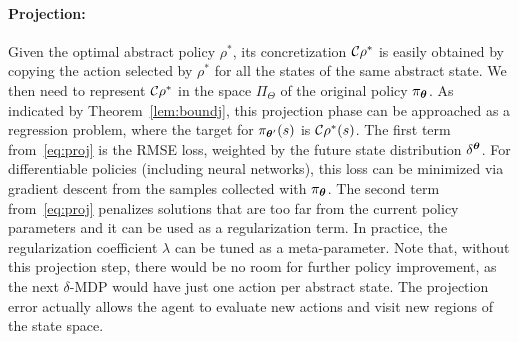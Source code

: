 \paragraph{Projection:}
Given the optimal abstract policy $\rho^*$, its concretization $\mathcal{C}\rho^*$ is easily obtained by copying the action selected by $\rho^{*}$ for all the states of the same abstract state. We then need to represent $\mathcal{C}\rho^{*}$ in the space $\Pi_{\Theta}$ of the original policy $\pi_{\boldsymbol{\theta}}$. As indicated by Theorem~\ref{lem:boundj}, this projection phase can be approached as a regression problem, where the target for $\pi_{\boldsymbol{\theta}'}(s)$ is $\mathcal{C}\rho^*(s)$. 
The first term from~\eqref{eq:proj} is the RMSE loss, weighted by the future state distribution $\delta^{\boldsymbol{\theta}}$. For differentiable policies (including neural networks), this loss can be minimized via gradient descent from the samples collected with $\pi_{\boldsymbol{\theta}}$. The second term from~\eqref{eq:proj} penalizes solutions that are too far from the current policy parameters and it can be used as a regularization term. In practice, the regularization coefficient $\lambda$ can be tuned as a meta-parameter. Note that, without this projection step, there would be no room for further policy improvement, as the next $\delta$-MDP would have just one action per abstract state. The projection error actually allows the agent to evaluate new actions and visit new regions of the state space. 